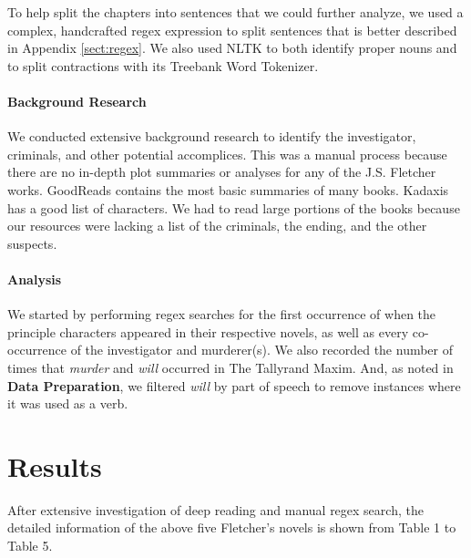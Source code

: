 \documentclass{article}
\begin{document}
To help split the chapters into sentences that we could further analyze, we used a complex, handcrafted regex expression to split sentences that is better described in Appendix \ref{sect:regex}. We also used NLTK to both identify proper nouns and to split contractions with its Treebank Word Tokenizer. 

\paragraph{Background Research} We conducted extensive background research to identify the investigator, criminals, and other potential accomplices. This was a manual process because there are no in-depth plot summaries or analyses for any of the J.S. Fletcher works. GoodReads \cite{goodreads} contains the most basic summaries of many books. Kadaxis \cite{kadaxis} has a good list of characters. We had to read large portions of the books because our resources were lacking a list of the criminals, the ending, and the other suspects. \\

\paragraph{Analysis} We started by performing regex searches for the first occurrence of when the principle characters appeared in their respective novels, as well as every co-occurrence of the investigator and murderer(s). We also recorded the number of times that \textit{murder} and \textit{will} occurred in The Tallyrand Maxim. And, as noted in \textbf{Data Preparation}, we filtered \textit{will} by part of speech to remove instances where it was used as a verb.

\section{Results}
After extensive investigation of deep reading and manual regex search, the detailed information of the above five Fletcher's novels is shown from Table 1 to Table 5.
\end{document}
